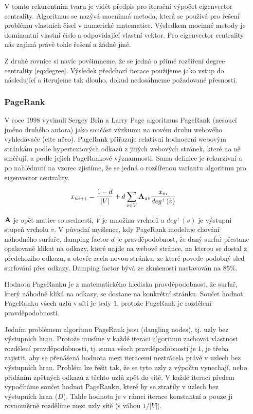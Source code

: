 \documentclass{bakalarka}
\begin{document}
V tomto rekurentním tvaru je vidět předpis pro iterační výpočet eigenvector
centrality. Algoritmus se nazývá mocninná metoda, která se používá pro řešení
problému vlastních čísel v numerické matematice. Výsledkem mocinné metody je
dominantní vlastní číslo a odpovídající vlastní vektor. Pro eigenvector
centrality nás zajímá právě tohle řešení a žádné jiné.

Z druhé rovnice si navíc povšimneme, že se jedná o přímé rozšíření degree
centrality \eqref{eq:degree}. Výsledek předchozí iterace použijeme jako vstup
do následující a iterujeme tak dlouho, dokud nedosáhneme požadované přesnosti.

\subsubsection{PageRank}
V roce 1998 vyvinuli Sergey Brin a Larry Page algoritmus PageRank (nesoucí
jméno druhého autora) jako součást výzkumu na novém druhu webového vyhledávače
(cite něco). PageRank přiřazuje relativní hodnocení webovým stránkám podle
hypertextových odkazů z jiných webových stránek, které na ně směřují, a podle
jejich PageRankové významnosti. Sama definice je rekurzivní a po nahlédnutí na
vzorec zjistíme, že se jedná o rozšířenou variantu algoritmu pro eigenvector
centrality.

\begin{align*}
{x_u}_{i + 1} &= \frac{1 - d}{|V|} + d \displaystyle\sum_{v \in V} {\bf A}_{uv}
\frac{{x_v}_{i}}{deg^+ (v)}
\end{align*}

${\bf A}$ je opět matice sousednosti, $V$ je množina vrcholů a $deg^+(v)$ je
výstupní stupeň vrcholu $v$.  V původní myšlence, kdy PageRank modeluje chování
náhodného surfaře, damping factor $d$ je pravděpodobnost, že daný surfař
přestane opakovaně klikat na odkazy, které najde na webové stránce, na kterou
se dostal z předchozího odkazu, a otevře zcela novou stránku, ze které povede
podobný sled surfování přes odkazy.  Damping factor bývá ze zkušenosti
nastavován na $85\%$.

Hodnota PageRanku je z matematického hlediska pravděpodobnost, že surfař, který
náhodně kliká na odkazy, se dostane na konkrétní stránku. Součet hodnot
PageRanku všech uzlů v síti je tedy $1$, protože PageRank je rozdělení
pravděpodobnosti.

Jedním problémem algoritmu PageRank jsou  (dangling nodes), tj.
uzly bez výstupních hran. Protože musíme v každé iteraci algoritmu zachovat
vlastnost rozdělení pravděpodobnosti, tj. suma všech pravděpodobností je $1$,
je třeba zajistit, aby se přenášená hodnota mezi iteracemi neztrácela právě v
uzlech bez výstupních hran. Problém lze řešit tak, že se tyto uzly z výpočtu
vynechají, nebo přidáním zpětných odkazů z těchto uzlů zpět do sítě.  V každé
iteraci předem vypočítáme součet hodnot PageRanku, které by se ztratily v
uzlech bez výstupních hran ($D$). Tahle hodnota je v rámci iterace konstantní a
pouze ji rovnoměrně rozdělíme mezi uzly sítě (s váhou $1/|V|$).
\end{document}

